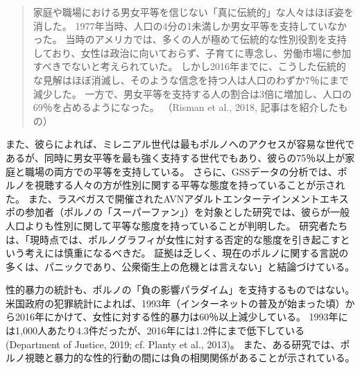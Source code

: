 \documentclass[paper=a4,book,openany]{jlreq}
\begin{document}
\begin{quote}
家庭や職場における男女平等を信じない「真に伝統的」な人々はほぼ姿を消した。
1977年当時、人口の4分の1未満しか男女平等を支持していなかった。
当時のアメリカでは、多くの人が極めて伝統的な性別役割を支持しており、女性は政治に向いておらず、子育てに専念し、労働市場に参加すべきでないと考えられていた。
しかし2016年までに、こうした伝統的な見解はほぼ消滅し、そのような信念を持つ人は人口のわずか7％にまで減少した。
一方で、男女平等を支持する人の割合は3倍に増加し、人口の69％を占めるようになった。
（Risman et al., 2018, 記事は\citet{scarborough19:_attit_stall_gender_revol}を紹介したもの）
\nocite{risman18:_good_news,scarborough19:_attit_stall_gender_revol,risman18:_good_news}
\end{quote}

また、彼らによれば、ミレニアル世代は最もポルノへのアクセスが容易な世代であるが、同時に男女平等を最も強く支持する世代でもあり、彼らの75％以上が家庭と職場の両方での平等を支持している。
さらに、GSSデータの分析では、ポルノを視聴する人々の方が性別に関する平等な態度を持っていることが示された\citep{taylor16:_is_pornog_reall_makin_hate_women}。
また、ラスベガスで開催されたAVNアダルトエンターテインメントエキスポの参加者（ポルノの「スーパーファン」）を対象とした研究では、彼らが一般人口よりも性別に関して平等な態度を持っていることが判明した\citep{jackson19:_expos_mens_gender_role_attit_porn_super}。
研究者たちは、「現時点では、ポルノグラフィが女性に対する否定的な態度を引き起こすという考えには慎重になるべきだ。
証拠は乏しく、現在のポルノに関する言説の多くは、パニックであり、公衆衛生上の危機とは言えない」と結論づけている\citep{maginn19:_how_male_porn_super_reall_view_women}。

性的暴力の統計も、ポルノの「負の影響パラダイム」を支持するものではない。
米国政府の犯罪統計によれば、1993年（インターネットの普及が始まった頃）から2016年にかけて、女性に対する性的暴力は60％以上減少している。
1993年には1,000人あたり4.3件だったが、2016年には1.2件にまで低下している(Department of Justice, 2019; cf. Planty et al., 2013)。
\nocite{department19:_nation_crime_victim_survey}
また、ある研究では、ポルノ視聴と暴力的な性的行動の間には負の相関関係があることが示されている\citep{ferguson09:_pleas_is_momen}。
\end{document}

